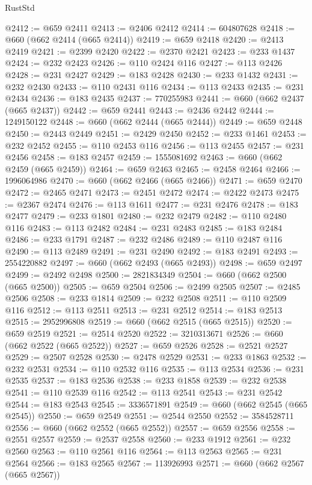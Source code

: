 \begin{lexlean}{RustStd}
\begin{coremodule}
{\begin{coremodule}
{{{{{{{{{{{{{{{{{{{{{{{{{{{{{{{{{{{{{{{{{{{{{{{@2412 := @659 @2411
@2413 := @2406 @2412
@2414 := 604807628
@2418 := @660 (@662 @2414 (@665 @2414))
@2419 := @659 @2418
@2420 := @2413 @2419
@2421 := @2399 @2420
@2422 := @2370 @2421
@2423 := @233 @1437
@2424 := @232 @2423
@2426 := @110 @2424 @116
@2427 := @113 @2426
@2428 := @231 @2427
@2429 := @183 @2428
@2430 := @233 @1432
@2431 := @232 @2430
@2433 := @110 @2431 @116
@2434 := @113 @2433
@2435 := @231 @2434
@2436 := @183 @2435
@2437 := 770255983
@2441 := @660 (@662 @2437 (@665 @2437))
@2442 := @659 @2441
@2443 := @2436 @2442
@2444 := 1249150122
@2448 := @660 (@662 @2444 (@665 @2444))
@2449 := @659 @2448
@2450 := @2443 @2449
@2451 := @2429 @2450
@2452 := @233 @1461
@2453 := @232 @2452
@2455 := @110 @2453 @116
@2456 := @113 @2455
@2457 := @231 @2456
@2458 := @183 @2457
@2459 := 1555081692
@2463 := @660 (@662 @2459 (@665 @2459))
@2464 := @659 @2463
@2465 := @2458 @2464
@2466 := 1996064986
@2470 := @660 (@662 @2466 (@665 @2466))
@2471 := @659 @2470
@2472 := @2465 @2471
@2473 := @2451 @2472
@2474 := @2422 @2473
@2475 := @2367 @2474
@2476 := @113 @1611
@2477 := @231 @2476
@2478 := @183 @2477
@2479 := @233 @1801
@2480 := @232 @2479
@2482 := @110 @2480 @116
@2483 := @113 @2482
@2484 := @231 @2483
@2485 := @183 @2484
@2486 := @233 @1791
@2487 := @232 @2486
@2489 := @110 @2487 @116
@2490 := @113 @2489
@2491 := @231 @2490
@2492 := @183 @2491
@2493 := 2554220882
@2497 := @660 (@662 @2493 (@665 @2493))
@2498 := @659 @2497
@2499 := @2492 @2498
@2500 := 2821834349
@2504 := @660 (@662 @2500 (@665 @2500))
@2505 := @659 @2504
@2506 := @2499 @2505
@2507 := @2485 @2506
@2508 := @233 @1814
@2509 := @232 @2508
@2511 := @110 @2509 @116
@2512 := @113 @2511
@2513 := @231 @2512
@2514 := @183 @2513
@2515 := 2952996808
@2519 := @660 (@662 @2515 (@665 @2515))
@2520 := @659 @2519
@2521 := @2514 @2520
@2522 := 3210313671
@2526 := @660 (@662 @2522 (@665 @2522))
@2527 := @659 @2526
@2528 := @2521 @2527
@2529 := @2507 @2528
@2530 := @2478 @2529
@2531 := @233 @1863
@2532 := @232 @2531
@2534 := @110 @2532 @116
@2535 := @113 @2534
@2536 := @231 @2535
@2537 := @183 @2536
@2538 := @233 @1858
@2539 := @232 @2538
@2541 := @110 @2539 @116
@2542 := @113 @2541
@2543 := @231 @2542
@2544 := @183 @2543
@2545 := 3336571891
@2549 := @660 (@662 @2545 (@665 @2545))
@2550 := @659 @2549
@2551 := @2544 @2550
@2552 := 3584528711
@2556 := @660 (@662 @2552 (@665 @2552))
@2557 := @659 @2556
@2558 := @2551 @2557
@2559 := @2537 @2558
@2560 := @233 @1912
@2561 := @232 @2560
@2563 := @110 @2561 @116
@2564 := @113 @2563
@2565 := @231 @2564
@2566 := @183 @2565
@2567 := 113926993
@2571 := @660 (@662 @2567 (@665 @2567))
}}}}}}}}}}}}}}}}}}}}}}}}}}}}}}}}}}}}}}}}}}}}}}}
\end{coremodule}}
\end{coremodule}
\end{lexlean}
